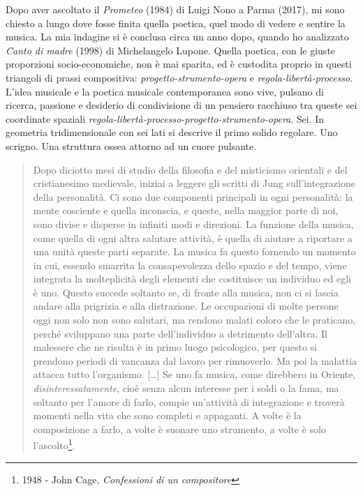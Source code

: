 Dopo aver ascoltato il \emph{Prometeo} (1984) di Luigi Nono a Parma (2017), mi sono chiesto a lungo
dove fosse finita quella poetica,
quel modo di vedere e sentire la musica. La mia indagine si è conclusa circa un anno dopo, quando ho
analizzato \emph{Canto di madre} (1998) di Michelangelo Lupone.
Quella poetica, con le giuste proporzioni socio-economiche,
non è mai sparita, ed è custodita proprio in questi triangoli di prassi compositiva: \emph{progetto-strumento-opera}
e \emph{regola-libertà-processo}. L'idea musicale e la poetica musicale contemporanea
sono vive, pulsano di ricerca, passione e desiderio di condivisione di un pensiero
racchiuso tra queste sei coordinate spaziali \emph{regola-libertà-processo-progetto-strumento-opera}.
Sei. In geometria tridimensionale con sei lati si descrive il primo solido regolare. Uno scrigno.
Una struttura ossea attorno ad un cuore pulsante.

\begin{quote}
  Dopo diciotto mesi di studio della filosofia e del misticismo orientali e del
  cristianesimo medievale, iniziai a leggere gli scritti di Jung sull'integrazione
  della personalità. Ci sono due componenti principali in ogni personalità:
  la mente cosciente e quella inconscia, e queste, nella maggior parte di noi,
  sono divise e disperse in infiniti modi e direzioni. La funzione della musica,
  come quella di ogni altra salutare attività, è quella di aiutare a riportare a
  una unità queste parti separate. La musica fa questo fornendo un momento in cui,
  essendo smarrita la consapevolezza dello spazio e del tempo, viene integrata la
  molteplicità degli elementi che costituisce un individuo ed egli è uno. Questo succede
  soltanto se, di fronte alla musica, non ci si lascia andare alla prigrizia e alla distrazione.
  Le occupazioni di molte persone oggi non solo non sono salutari, ma rendono malati coloro
  che le praticano, perché sviluppano una parte dell'individuo a detrimento dell'altra.
  Il malessere che ne risulta è in primo luogo psicologico, per questo si prendono periodi
  di vancanza dal lavoro per rimuoverlo. Ma poi la malattia attacca tutto l'organismo.
  [\ldots] Se uno fa musica, come direbbero in Oriente, \emph{disinteressatamente}, cioè
  senza alcun interesse per i soldi o la fama, ma soltanto per l'amore di farlo,
  compie un'attività di integrazione e troverà momenti nella vita che sono completi e
  appaganti. A volte è la composizione a farlo, a volte è suonare uno strumento, a
  volte è solo l'ascolto\footnote{1948 - John Cage, \emph{Confessioni di un compositore}}.
\end{quote}

